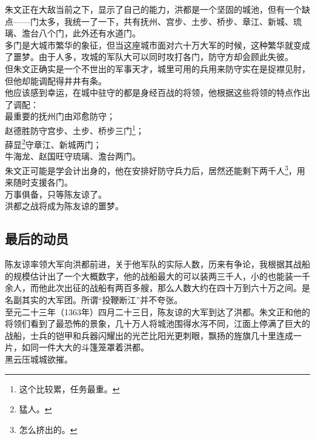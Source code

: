 \begin{multicols}{\theparacolNo}
朱文正在大敌当前之下，显示了自己的能力，洪都是一个坚固的城池，但有一个缺点——门太多，我统一了一下，共有抚州、宫步、土步、桥步、章江、新城、琉璃、澹台八个门，此外还有水道门。\\

多门是大城市繁华的象征，但当这座城市面对六十万大军的时候，这种繁华就变成了噩梦。由于人多，攻城的军队大可以同时攻打各门，防守方却会顾此失彼。\\

但朱文正确实是一个不世出的军事天才，城里可用的兵用来防守实在是捉襟见肘，但他却能调配得井井有条。\\

他应该感到幸运，在城中驻守的都是身经百战的将领，他根据这些将领的特点作出了调配：\\

最重要的抚州门由邓愈防守；\\

赵德胜防守宫步、土步、桥步三门\footnote{这个比较累，任务最重。}；\\

薛显\footnote{猛人。}守章江、新城两门；\\

牛海龙、赵国旺守琉璃、澹台两门。\\

朱文正可能是学会计出身的，他在安排好防守兵力后，居然还能剩下两千人\footnote{怎么挤出的。}，用来随时支援各门。\\

万事俱备，只等陈友谅了。\\

洪都之战将成为陈友谅的噩梦。\\

\subsection{最后的动员}
陈友谅率领大军向洪都前进，关于他军队的实际人数，历来有争论，我根据其战船的规模估计出了一个大概数字，他的战船最大的可以装两三千人，小的也能装一千余人，而他此次出征的战船有两百多艘，那么人数大约在四十万到六十万之间。是名副其实的大军团。所谓“投鞭断江”并不夸张。\\

至元二十三年（1363年）四月二十三日，陈友谅的大军到达了洪都。朱文正和他的将领们看到了最恐怖的景象，几十万人将城池围得水泻不同，江面上停满了巨大的战船，士兵的铠甲和兵器闪耀出的光芒比阳光更刺眼，飘扬的旌旗几十里连成一片，如同一件大大的斗篷笼罩着洪都。\\

黑云压城城欲摧。\\


\end{multicols}

